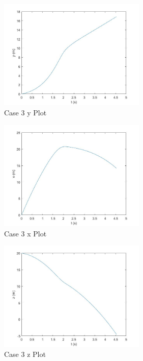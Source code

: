 \documentclass[12pt,twoside,letterpaper]{article}
\begin{document}
\begin{multicols}{3}

\begin{figure}[H]
\centering
\includegraphics[width=7cm]{figures/case_3_y.jpg}
\caption{Case 3 y Plot}
\label{Case 3 y Plot}

\end{figure}
\begin{figure}[H]
\centering
\includegraphics[width=7cm]{figures/case_3_x.jpg}
\caption{Case 3 x Plot}
\label{Case 3 x Plot}
\end{figure}
\begin{figure}[H]
\centering
\includegraphics[width=7cm]{figures/case_3_z.jpg}
\caption{Case 3 z Plot}
\label{Case 3 z Plot}
\end{figure}

\end{multicols}
\newpage
\end{document}

